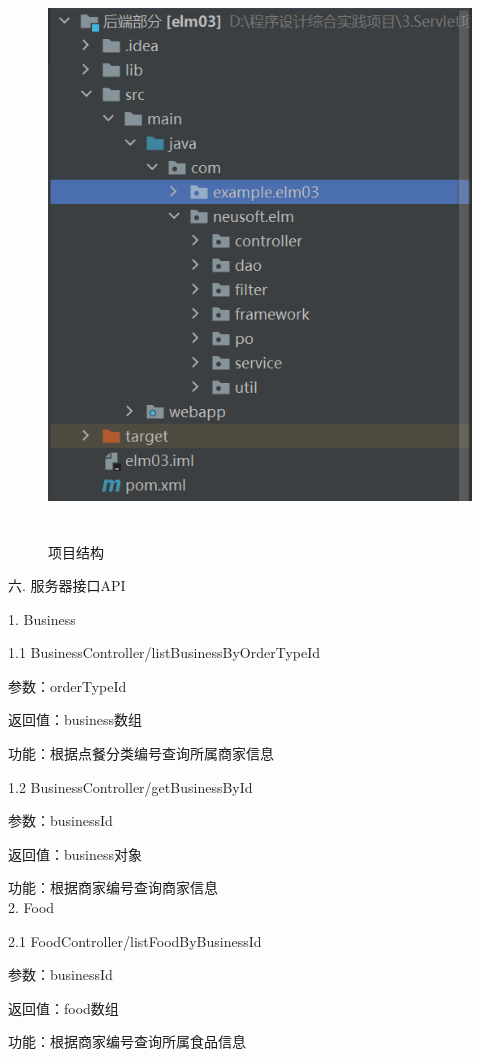 \begin{figure}[H]
    \centering
    \includegraphics[width=15cm,height=15cm]{figures/structure3.png}
    \caption{项目结构}
\end{figure}

\noindent
六. 服务器接口API

1. Business

1.1 BusinessController/listBusinessByOrderTypeId 

参数：orderTypeId 

返回值：business数组

功能：根据点餐分类编号查询所属商家信息

1.2 BusinessController/getBusinessById 

参数：businessId 

返回值：business对象

功能：根据商家编号查询商家信息~\\

2. Food

2.1 FoodController/listFoodByBusinessId 

参数：businessId 

返回值：food数组

功能：根据商家编号查询所属食品信息~\\

